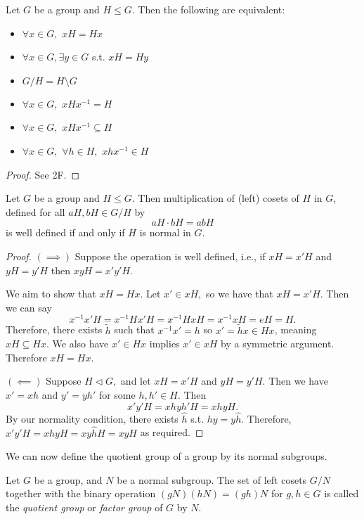 \begin{theorem}
    Let $G$ be a group and $H\leq G.$ Then the following are equivalent:
    \begin{itemize}
        \item  $\forall x\in G,$ $xH=Hx$
        \item  $\forall x\in G,  \exists y\in G$ s.t. $xH=Hy$
        \item  $G/H=H\setminus G$
        \item  $\forall x\in G,$ $xHx^{-1}=H$
        \item  $\forall x\in G,$ $xHx^{-1}\subseteq H$
        \item  $\forall x \in G,$ $\forall h\in H,$ $xhx^{-1} \in H$
    \end{itemize}
\end{theorem}
\begin{proof}
    See 2F.
\end{proof}
\begin{theorem}
    Let $G$ be a group and $H\leq G.$ Then multiplication of (left) cosets of $H$ in $G$, defined for all $aH,bH \in G/H$ by
    $$aH\cdot bH=abH$$
    is well defined if and only if $H$ is normal in $G.$
    \label{normality}
\end{theorem}
\begin{proof}
    $(\implies)$ Suppose the operation is well defined, i.e., if $xH=x'H$ and $yH=y'H$ then $xyH=x'y'H.$

    We aim to show that $xH = Hx.$
    Let $x'\in xH,$ so we have that $xH=x'H$.
    Then we can say
    $$x^{-1}x'H=x^{-1}Hx'H=x^{-1}HxH=x^{-1}xH=eH=H.$$
    Therefore, there exists $\widetilde{h}$ such that $x^{-1}x'=h$ so $x'=\widetilde{h}x \in Hx$, meaning $xH \subseteq Hx.$
    We also have $x'\in Hx$ implies $x'\in xH$ by a symmetric argument. Therefore $xH=Hx$.
    
    $(\impliedby)$ Suppose $H\triangleleft G,$ and let $xH=x'H$ and $yH=y'H.$ Then we have $x'=xh$ and $y'=yh'$ for some $h,h'\in H.$ Then
    $$x'y'H=xhyh'H=xhyH.$$ By our normality condition, there exists $\hat{h}$ s.t. $hy=y\hat{h}.$ Therefore, $x'y'H=xhyH=xy\hat{h}H=xyH$ as required.
\end{proof}
We can now define the quotient group of a group by its normal subgroups.
\begin{definition}
  Let $G$ be a group, and $N$ be a normal subgroup. The set of left cosets $G/N$ together
  with the binary operation $(gN)(hN)=(gh)N$ for $g,h\in G$ is called the \emph{quotient
  group} or \emph{factor group} of $G$ by $N$.
  \label{quotientGroup}
\end{definition}
